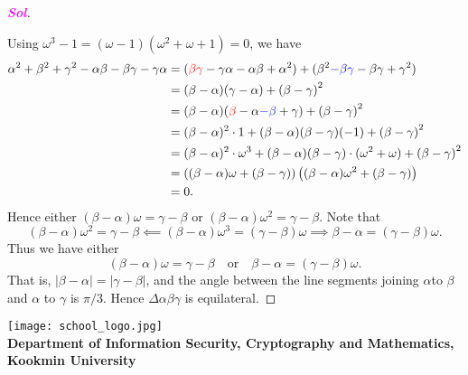 \documentclass{article}
\newcommand{\footer}[1]{
	\begin{flushright}
		\vspace{2em}
		\texttt{[image: school\_logo.jpg]} \\
		\vspace{1em}
		\textcolor{blue2}{\small\textbf{#1}}
	\end{flushright}
}
\theoremstyle{definition}
\newcommand{\of}[1]{\left( #1 \right)}
\newcommand{\abs}[1]{\left\lvert #1 \right\rvert}
\newcommand{\sol}{\textcolor{magenta}{\bf Sol}}
\begin{document}
\begin{enumerate}
\begin{proof}[\sol]
\begin{center}
		\end{center}
			Using $\omega^3-1=(\omega-1)\of{\omega^2+\omega+1}=0$, we have \begin{align*}
			\alpha^2+\beta^2+\gamma^2-\alpha\beta-\beta\gamma-\gamma\alpha&=(\textcolor{red}{\beta\gamma} - \gamma\alpha - \alpha\beta + \alpha^2) + (\beta^2\textcolor{blue}{-\beta\gamma} -\beta\gamma + \gamma^2)\\
			&=(\beta-\alpha)(\gamma-\alpha)+\of{\beta-\gamma}^2\\
			&=(\beta-\alpha)(\textcolor{red}{\beta}-\alpha\textcolor{blue}{-\beta}+\gamma)+\of{\beta-\gamma}^2\\
			&=(\beta-\alpha)^2\cdot 1+(\beta-\alpha)(\beta-\gamma)(-1)+\of{\beta-\gamma}^2\\
			&=(\beta-\alpha)^2\cdot\omega^3+(\beta-\alpha)(\beta-\gamma)\cdot(\omega^2+\omega)+\of{\beta-\gamma}^2\\
			&=\of{(\beta-\alpha)\omega+(\beta-\gamma)}\of{(\beta-\alpha)\omega^2+(\beta-\gamma)}\\
			&=0.
			\end{align*} Hence either $\of{\beta-\alpha}\omega=\gamma-\beta$ or $\of{\beta-\alpha}\omega^2=\gamma-\beta$. Note that \[
			\of{\beta-\alpha}\omega^2=\gamma-\beta\impliedby\of{\beta-\alpha}\omega^3=\of{\gamma-\beta}\omega\implies\beta-\alpha=\of{\gamma-\beta}\omega.
			\] Thus we have either \[
			\of{\beta-\alpha}\omega=\gamma-\beta\quad\text{or}\quad\beta-\alpha=\of{\gamma-\beta}\omega.
			\] That is, $\abs{\beta-\alpha}=\abs{\gamma-\beta}$, and the angle between the line segments joining $\alpha$to $\beta$ and $
			\alpha$ to $\gamma$ is $\pi/3$. Hence $\Delta\alpha\beta\gamma$ is equilateral.
		\end{proof}
	\end{enumerate}
	
	
	\footer{Department of Information Security, Cryptography and Mathematics, Kookmin University}
\end{document}
